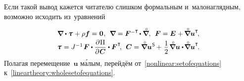 \begin{otherlanguage}{russian}

Если такой вывод кажется читателю слишком формальным и~мало\-нагляд\-ным, возможно исходить из~уравнений %

\nopagebreak\vspace{0.1em}\begin{equation}\label{nonlinear:setofequations}
\begin{array}{c}
\boldnabla \dotp \mathboldtau \hspace{0.15ex} + \rho \bm{f} = \hspace{0.1ex} \bm{0} \hspace{0.1ex}, \:\:
\boldnabla = \bm{F}^{-\T} \hspace{-0.2ex} \dotp \boldnablacircled , \:\:
\bm{F} = \bm{E} \hspace{0.1ex} + \hspace{-0.1ex} \boldnablacircled {\bm{u}}^{\T} \hspace{-0.3ex}, \\[0.2em]
\mathboldtau \hspace{0.1ex} = J^{-1} \hspace{0.2ex} \bm{F} \dotp \displaystyle \frac{\partial\hspace{0.1ex} \Pi}{\partial\hspace{0.1ex} \bm{C}} \dotp \bm{F}^{\hspace{0.1ex}\T} \hspace{-0.4ex}, \:\:
\bm{C} = \boldnablacircled {\bm{u}}^{\hspace{0.1ex}\mathsf{S}} \hspace{-0.2ex} + \hspace{0.2ex} \displaystyle \onehalf \hspace{0.2ex} \boldnablacircled \bm{u} \dotp \hspace{-0.25ex} \boldnablacircled \bm{u}^{\T} \hspace{-0.25ex}.
\end{array}
\vspace{0.12em}\end{equation}
Полагая перемещение~$\bm{u}$ м\'{а}лым, перейдём от~\eqref{nonlinear:setofequations} к~\eqref{lineartheory:wholesetofequations}.


\end{otherlanguage}
